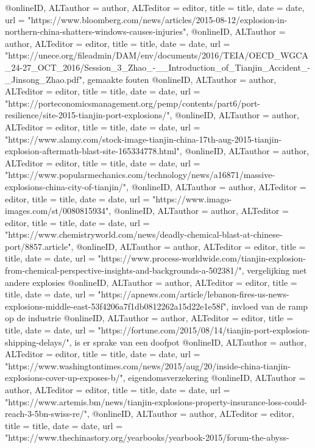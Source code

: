 {{{{{{@online{ID,	ALTauthor = {author},	ALTeditor = {editor},	title = {title},	date = {date},	url = {"https://www.bloomberg.com/news/articles/2015-08-12/explosion-in-northern-china-shatters-windows-causes-injuries"},}
@online{ID,	ALTauthor = {author},	ALTeditor = {editor},	title = {title},	date = {date},	url = {"https://unece.org/fileadmin/DAM/env/documents/2016/TEIA/OECD_WGCA_24-27_OCT_2016/Session_3_Zhao_-__Introduction_of_Tianjin_Accident_-_Jinsong_Zhao.pdf"},}
gemaakte fouten
@online{ID,	ALTauthor = {author},	ALTeditor = {editor},	title = {title},	date = {date},	url = {"https://porteconomicsmanagement.org/pemp/contents/part6/port-resilience/site-2015-tianjin-port-explosions/"},}
@online{ID,	ALTauthor = {author},	ALTeditor = {editor},	title = {title},	date = {date},	url = {"https://www.alamy.com/stock-image-tianjin-china-17th-aug-2015-tianjin-explosion-aftermath-blast-site-165334778.html"},}
@online{ID,	ALTauthor = {author},	ALTeditor = {editor},	title = {title},	date = {date},	url = {"https://www.popularmechanics.com/technology/news/a16871/massive-explosions-china-city-of-tianjin/"},}
@online{ID,	ALTauthor = {author},	ALTeditor = {editor},	title = {title},	date = {date},	url = {"https://www.imago-images.com/st/0080815934"},}
@online{ID,	ALTauthor = {author},	ALTeditor = {editor},	title = {title},	date = {date},	url = {"https://www.chemistryworld.com/news/deadly-chemical-blast-at-chinese-port/8857.article"},}
@online{ID,	ALTauthor = {author},	ALTeditor = {editor},	title = {title},	date = {date},	url = {"https://www.process-worldwide.com/tianjin-explosion-from-chemical-perspective-insights-and-backgrounds-a-502381/"},}
vergelijking met andere explosies
@online{ID,	ALTauthor = {author},	ALTeditor = {editor},	title = {title},	date = {date},	url = {"https://apnews.com/article/lebanon-fires-us-news-explosions-middle-east-53f4206a7f1db0812262a15d22e1e58f"},}
invloed van de ramp op de industrie
@online{ID,	ALTauthor = {author},	ALTeditor = {editor},	title = {title},	date = {date},	url = {"https://fortune.com/2015/08/14/tianjin-port-explosion-shipping-delays/"},}
is er sprake van een doofpot
@online{ID,	ALTauthor = {author},	ALTeditor = {editor},	title = {title},	date = {date},	url = {"https://www.washingtontimes.com/news/2015/aug/20/inside-china-tianjin-explosions-cover-up-exposes-b/"},}
eigendomsverzekering
@online{ID,	ALTauthor = {author},	ALTeditor = {editor},	title = {title},	date = {date},	url = {"https://www.artemis.bm/news/tianjin-explosions-property-insurance-loss-could-reach-3-5bn-swiss-re/"},}
@online{ID,	ALTauthor = {author},	ALTeditor = {editor},	title = {title},	date = {date},	url = {"https://www.thechinastory.org/yearbooks/yearbook-2015/forum-the-abyss-%
}}}}}}}}
